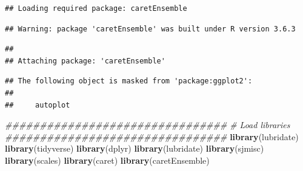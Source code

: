 \documentclass[]{article}
\newenvironment{Shaded}{\begin{snugshade}}{\end{snugshade}}
\newcommand{\CommentTok}[1]{\textcolor[rgb]{0.56,0.35,0.01}{\textit{#1}}}
\newcommand{\KeywordTok}[1]{\textcolor[rgb]{0.13,0.29,0.53}{\textbf{#1}}}
\newcommand{\NormalTok}[1]{#1}
\begin{document}
\begin{verbatim}
## Loading required package: caretEnsemble
\end{verbatim}

\begin{verbatim}
## Warning: package 'caretEnsemble' was built under R version 3.6.3
\end{verbatim}

\begin{verbatim}
## 
## Attaching package: 'caretEnsemble'
\end{verbatim}

\begin{verbatim}
## The following object is masked from 'package:ggplot2':
## 
##     autoplot
\end{verbatim}

\begin{Shaded}
\begin{Highlighting}[]
\CommentTok{################################}
\CommentTok{# Load libraries}
\CommentTok{################################}
\KeywordTok{library}\NormalTok{(lubridate)}
\KeywordTok{library}\NormalTok{(tidyverse)}
\KeywordTok{library}\NormalTok{(dplyr)}
\KeywordTok{library}\NormalTok{(lubridate)}
\KeywordTok{library}\NormalTok{(sjmisc)}
\KeywordTok{library}\NormalTok{(scales)}
\KeywordTok{library}\NormalTok{(caret)}
\KeywordTok{library}\NormalTok{(caretEnsemble)}
\end{Highlighting}
\end{Shaded}
\end{document}
